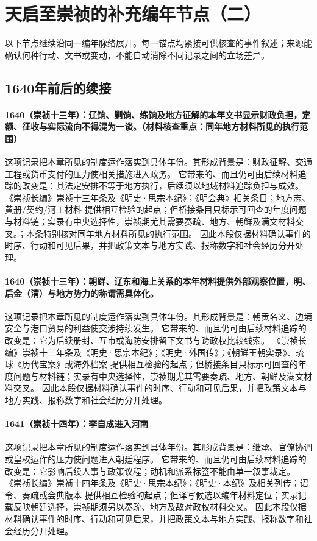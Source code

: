 \section{天启至崇祯的补充编年节点（二）}
以下节点继续沿同一编年脉络展开。每一锚点均紧接可供核查的事件叙述；来源能确认何种行动、文书或变动，不能自动消除不同记录之间的立场差异。

\subsection{1640年前后的续接}

\paragraph{1640（崇祯十三年）：辽饷、剿饷、练饷及地方征解的本年文书显示财政负担，定额、征收与实际流向不得混为一谈。（材料核查重点：同年地方材料所见的执行范围）} 这项记录把本章所见的制度运作落实到具体年份。其形成背景是：财政征解、交通工程或货币支付的压力使相关措施进入政务。 它带来的、而且仍可由后续材料追踪的改变是：其法定安排不等于地方执行，后续须以地域材料追踪负担与成效。 《崇祯长编》崇祯十三年条及《明史·思宗本纪》；《明会典》相关条目；地方志、黄册/契约/河工材料 提供相互检验的起点；但桥接条目只标示可回查的年度问题与材料链；实录有中央选择性，崇祯期尤其需要奏疏、地方、朝鲜及满文材料交叉。；本条特别核对同年地方材料所见的执行范围。 因此本段仅据材料确认事件的时序、行动和可见后果，并把政策文本与地方实践、报称数字和社会经历分开处理。

\paragraph{1640（崇祯十三年）：朝鲜、辽东和海上关系的本年材料提供外部观察位置，明、后金（清）与地方势力的称谓需具体化。} 这项记录把本章所见的制度运作落实到具体年份。其形成背景是：朝贡名义、边境安全与港口贸易的利益使交涉持续发生。 它带来的、而且仍可由后续材料追踪的改变是：它为后续册封、互市或海防安排留下文书与跨政权比较线索。 《崇祯长编》崇祯十三年条及《明史·思宗本纪》；《明史·外国传》；《朝鲜王朝实录》、琉球《历代宝案》或海外档案 提供相互检验的起点；但桥接条目只标示可回查的年度问题与材料链；实录有中央选择性，崇祯期尤其需要奏疏、地方、朝鲜及满文材料交叉。 因此本段仅据材料确认事件的时序、行动和可见后果，并把政策文本与地方实践、报称数字和社会经历分开处理。

\paragraph{1641（崇祯十四年）：李自成进入河南} 这项记录把本章所见的制度运作落实到具体年份。其形成背景是：继承、官僚协调或皇权运作的压力使问题进入朝廷程序。 它带来的、而且仍可由后续材料追踪的改变是：它影响后续人事与政策议程；动机和派系标签不能由单一叙事裁定。 《崇祯长编》崇祯十四年条及《明史·思宗本纪》；《明史·本纪》及相关列传；诏令、奏疏或会典版本 提供相互检验的起点；但译写候选以编年材料定位；实录记载反映朝廷选择，崇祯期须另以奏疏、地方及敌对政权材料交叉。 因此本段仅据材料确认事件的时序、行动和可见后果，并把政策文本与地方实践、报称数字和社会经历分开处理。

